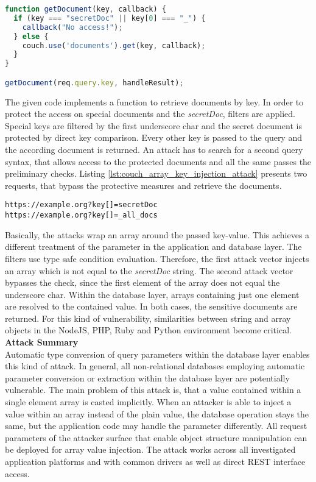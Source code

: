 \begin{lstlisting}[caption={Vulnerable NodeJS example for array key injection against CouchDB}, label={lst:couch_array_key_injection}, language=JavaScript]
function getDocument(key, callback) {
  if (key === "secretDoc" || key[0] === "_") {
    callback("No access!");
  } else {
    couch.use('documents').get(key, callback);
  }
}

getDocument(req.query.key, handleResult);
\end{lstlisting}

The given code implements a function to retrieve documents by key. In order to protect the access on special documents and the \emph{secretDoc}, filters are applied. Special keys are filtered by the first underscore char and the secret document is protected by direct key comparison. Every other key is passed to the query and the according document is returned. An attack has to search for a second query syntax, that allows access to the protected documents and all the same passes the preliminary checks. Listing \ref{lst:couch_array_key_injection_attack} presents two requests, that bypass the protective measures and retrieve the documents. \\

\begin{lstlisting}[caption={Attack vectors against CouchDB for array key injection via the query-string parameter}, label={lst:couch_array_key_injection_attack}]
https://example.org?key[]=secretDoc
https://example.org?key[]=_all_docs
\end{lstlisting}

Basically, the attacks wrap an array around the passed key-value. This achieves a different treatment of the parameter in the application and database layer. The filters use type safe condition evaluation. Therefore, the first attack vector injects an array which is not equal to the \emph{secretDoc} string. The second attack vector bypasses the check, since the first element of the array does not equal the underscore char. Within the database layer, arrays containing just one element are resolved to the contained value. In both cases, the sensitive documents are returned. For this kind of vulnerability, similarities between string and array objects in the NodeJS, PHP, Ruby and Python environment become critical. \\

\textbf{Attack Summary} \\
Automatic type conversion of query parameters within the database layer enables this kind of attack. In general, all non-relational databases employing automatic parameter conversion or extraction within the database layer are potentially vulnerable. The main problem of this attack is, that a value contained within a single element array is casted implicitly. When an attacker is able to inject a value within an array instead of the plain value, the database operation stays the same, but the application code may handle the parameter differently. All request parameters of the attacker surface that enable object structure manipulation can be deployed for array value injection. The attack works across all investigated application platforms and with common drivers as well as direct REST interface access. 

